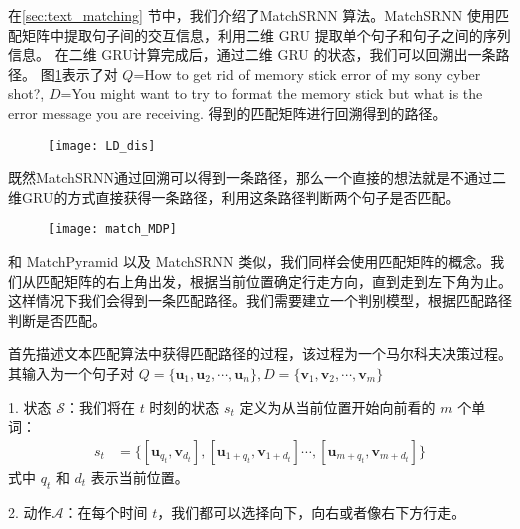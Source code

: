 在\ref{sec:text_matching} 节中，我们介绍了MatchSRNN\cite{Wan2016MatchSRNNMT} 算法。MatchSRNN 使用匹配矩阵中提取句子间的交互信息，利用二维 GRU 提取单个句子和句子之间的序列信息。 在二维 GRU计算完成后，通过二维 GRU 的状态，我们可以回溯出一条路径。
图\ref{fig:LD_dis}表示了对 $Q$=How to get rid of memory stick error of my
sony cyber shot?, $D$=You might want to try to format the memory
stick but what is the error message you are receiving. 得到的匹配矩阵进行回溯得到的路径。

\begin{figure}[H]
    \centering
    \texttt{[image: LD\_dis]}
    \label{fig:LD_dis}
\end{figure}

既然MatchSRNN通过回溯可以得到一条路径，那么一个直接的想法就是不通过二维GRU的方式直接获得一条路径，利用这条路径判断两个句子是否匹配。

\begin{figure}[!htbp]
    \centering
    \texttt{[image: match\_MDP]}
    \label{fig:match_MDP}
\end{figure}

和 MatchPyramid 以及 MatchSRNN 类似，我们同样会使用匹配矩阵的概念。我们从匹配矩阵的右上角出发，根据当前位置确定行走方向，直到走到左下角为止。这样情况下我们会得到一条匹配路径。我们需要建立一个判别模型，根据匹配路径判断是否匹配。

首先描述文本匹配算法中获得匹配路径的过程，该过程为一个马尔科夫决策过程。其输入为一个句子对 $Q=\{\mathbf{u}_1, \mathbf{u}_2,\cdots,\mathbf{u}_n\}, D=\{\mathbf{v}_1, \mathbf{v}_2,\cdots,\mathbf{v}_m\}$

1. 状态 $\mathcal{S}$：我们将在 $t$ 时刻的状态 $s_t$ 定义为从当前位置开始向前看的 $m$ 个单词：
$$
\begin{aligned}
s_t &= \{[\mathbf{u}_{q_t}, \mathbf{v}_{d_t}], [\mathbf{u}_{1+q_t},\mathbf{v}_{1+d_t}] \cdots, [\mathbf{u}_{m+q_t}, \mathbf{v}_{m+d_t}]\}
\end{aligned}
$$
式中 $q_t$ 和 $d_t$ 表示当前位置。

2. 动作$\mathcal{A}$：在每个时间 $t$，我们都可以选择向下，向右或者像右下方行走。

